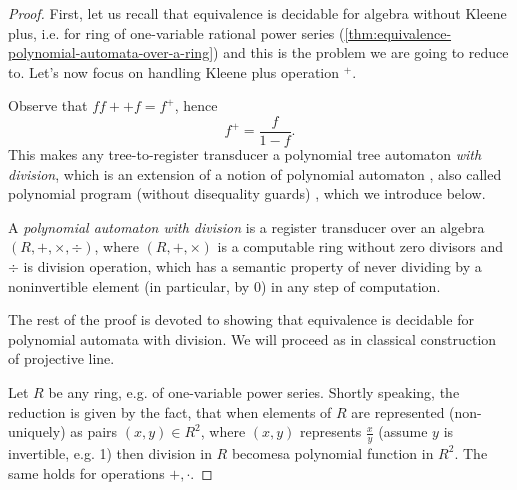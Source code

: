 \begin{proof}
    First, let us recall that equivalence is decidable for algebra \aalg without Kleene plus, i.e. for ring of one-variable rational power series  (\ref{thm:equivalence-polynomial-automata-over-a-ring}) and this is the problem we are going to reduce to. Let's now focus on handling Kleene plus operation $^+$.
    
  	Observe that $ff+ + f = f^+$, hence
  	$$
  		f^+ = \frac{f}{1-f}.
  	$$
  	This makes any tree-to-\aalg register transducer a polynomial tree automaton \emph{with division}, which is an extension of a notion of polynomial automaton \cite{worrellBenediktDuffSharad2017}, also called polynomial program (without disequality guards) \cite{seidlMuller-polynomial-programs04}, which we introduce below.
  	\begin{definition}
  		A \emph{polynomial automaton with division} is a register transducer over an algebra $(R, +, \times, \div)$, where $(R, +, \times)$ is a computable ring without zero divisors and $\div$ is division operation, which has a semantic property of never dividing by a noninvertible element (in particular, by 0) in any step of computation.
  	\end{definition}
  		The rest of the proof is devoted to showing that equivalence is decidable for polynomial automata with division. We will proceed as in classical construction of projective line.
  		
  		Let $R$ be any ring, e.g. of one-variable power series. Shortly speaking, the reduction is given by the fact, that when elements of $R$ are represented (non-uniquely) as pairs $(x,y)\in R^2$, where $(x,y)$ represents $\frac{x}{y}$ (assume $y$ is invertible, e.g. 1) then division in $R$ becomesa polynomial function in $R^2$. The same holds for operations $+, \cdot$.
  

\end{proof}
